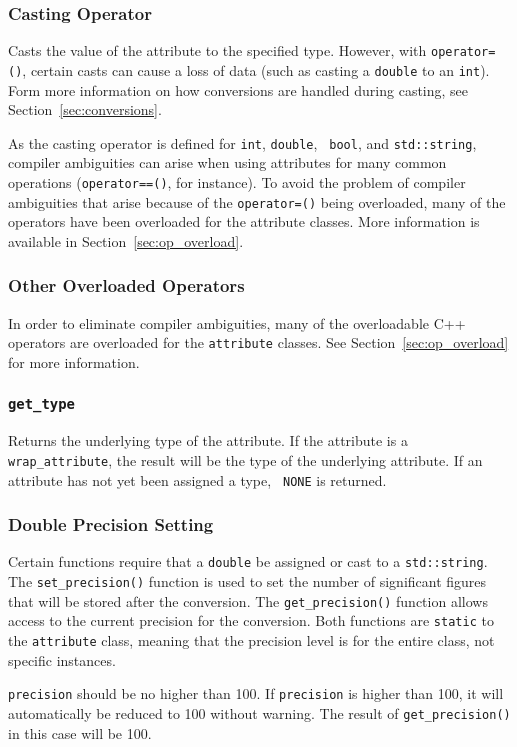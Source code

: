 \subsubsection{Casting Operator}


Casts the value of the attribute to the specified type.  However, with
{\tt operator=()}, certain casts can cause a loss of data (such as
casting a {\tt double} to an {\tt int}).  Form more information on how
conversions are handled during casting, see
Section~\ref{sec:conversions}.

As the casting operator is defined for {\tt int}, {\tt double}, {\tt
  bool}, and {\tt std::string}, compiler ambiguities can arise when
using attributes for many common operations ({\tt operator==()}, for
instance).  To avoid the problem of compiler ambiguities that arise
because of the {\tt operator=()} being overloaded, many of the
operators have been overloaded for the attribute classes.  More
information is available in Section~\ref{sec:op_overload}.

\subsubsection{Other Overloaded Operators}

In order to eliminate compiler ambiguities, many of the overloadable
C++ operators are overloaded for the {\tt attribute} classes. See
Section~\ref{sec:op_overload} for more information.

\subsubsection{{\tt get\_type}}
\label{sec:att:gettype}


Returns the underlying type of the attribute.  If the attribute is a
{\tt wrap\_attribute}, the result will be the type of the underlying
attribute.  If an attribute has not yet been assigned a type, {\tt
NONE} is returned.

\subsubsection{Double Precision Setting}
\label{sec:att:precision}


Certain functions require that a {\tt double} be assigned or cast to a
{\tt std::string}.  The {\tt set\_precision()} function is used to set
the number of significant figures  that will be stored after the
conversion.  The {\tt get\_precision()} function allows access to the
current precision for the conversion.  Both functions are {\tt static}
to the {\tt attribute} class, meaning that the precision level is for
the entire class, not specific instances.
  
{\tt precision} should be no higher than 100.  If {\tt precision}
is higher than 100, it will automatically be reduced to 100
without warning.  The result of {\tt get\_precision()} in this case
will be 100.
